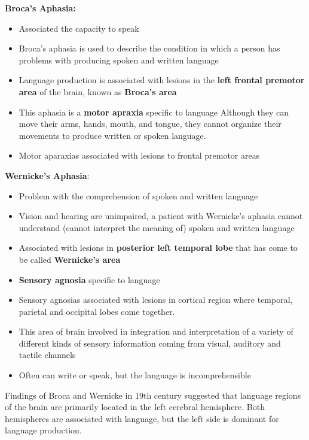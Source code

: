 \documentclass{article}
\begin{document}
\noindent \textbf{Broca's Aphasia:}
\begin{itemize}
    \item Associated the capacity to speak
    \item Broca's aphasia is used to describe the condition in which a person has problems with producing spoken and written language
    \item Language production is associated with lesions in the \textbf{left frontal premotor area} of the brain, known as \textbf{Broca's area}
    \item This aphasia is a \textbf{motor apraxia} specific to language
        \subitem Although they can move their arms, hands, mouth, and tongue, they cannot organize their movements to produce written or spoken language. 
    \item Motor aparaxias associated with lesions to frontal premotor areas
\end{itemize}

\noindent \textbf{Wernicke's Aphasia}: 
\begin{itemize}
    \item Problem with the comprehension of spoken and written language
    \item Vision and hearing are unimpaired, a patient with Wernicke's aphasia cannot understand (cannot interpret the meaning of) spoken and written language
    \item Associated with lesions in \textbf{posterior left temporal lobe} that has come to be called \textbf{Wernicke's area}
    \item \textbf{Sensory agnosia} specific to language 
    \item Sensory agnosias associated with lesions in cortical region where temporal, parietal and occipital lobes come together. 
    \item This area of brain involved in integration and interpretation of a variety of different kinds of sensory information coming from visual, auditory and tactile channels
    \item Often can write or speak, but the language is incomprehensible 
\end{itemize}

Findings of Broca and Wernicke in 19th century suggested that language regions of the brain are primarily located in the left cerebral hemisphere. Both hemispheres are associated with language, but the left side is dominant for language production. \\
\end{document}
